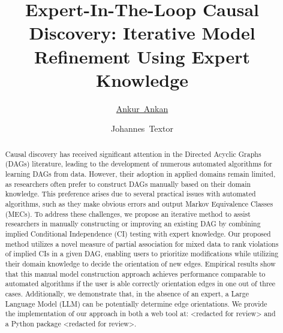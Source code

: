 \documentclass{uai2025} %
\title{Expert-In-The-Loop Causal Discovery: Iterative Model Refinement Using Expert Knowledge}
\author[1]{\href{mailto:<ankur.ankan@ru.nl>?Subject=Your UAI 2025 paper}{Ankur~Ankan}{}}
\author[1]{Johannes~Textor}
\affil[1]{%
    Institute for Computing and Information Sciences\\
    Radboud University\\
    Nijmegen, The Netherlands
}
\begin{document}
\maketitle

\begin{abstract}

Causal discovery has received significant attention in the Directed Acyclic
Graphs (DAGs) literature, leading to the development of numerous automated
algorithms for learning DAGs from data. However, their adoption in applied
domains remain limited, as researchers often prefer to construct DAGs manually
based on their domain knowledge. This preference arises due to several
practical issues with automated algorithms, such as they make obvious errors
and output Markov Equivalence Classes (MECs). To address these challenges, we
propose an iterative method to assist researchers in manually constructing or
improving an existing DAG by combining implied Conditional Independence (CI)
testing with expert knowledge. Our proposed method utilizes a novel measure of
partial association for mixed data to rank violations of implied CIs in a given
DAG, enabling users to prioritize modifications while utilizing their domain
knowledge to decide the orientation of new edges. Empirical results show that
this manual model construction approach achieves performance comparable to
automated algorithms if the user is able correctly orientation edges in one out
of three cases. Additionally, we demonstrate that, in the absence of an expert,
a Large Language Model (LLM) can be potentially determine edge orientations. We
provide the implementation of our approach in both a web tool at: <redacted for
review> and a Python package <redacted for review>.


\end{abstract}
\end{document}
